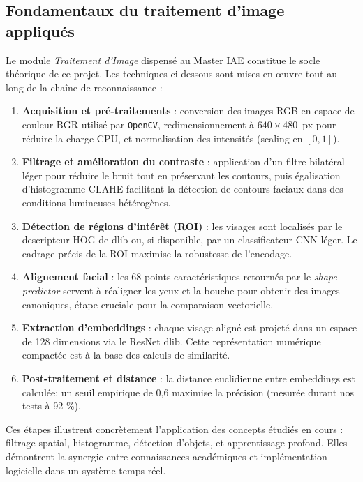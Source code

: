 \documentclass[12pt,a4paper]{article}
\begin{document}
\subsection{Fondamentaux du traitement d'image appliqués}
\label{sec:traitement-image}

Le module \textit{Traitement d'Image} dispensé au Master IAE constitue le socle théorique de ce projet. Les techniques ci-dessous sont mises en \oe{}uvre tout au long de la chaîne de reconnaissance :
\begin{enumerate}[label=\alph*)]
  \item \textbf{Acquisition et pré-traitements} : conversion des images RGB en espace de couleur BGR utilisé par \texttt{OpenCV}, redimensionnement à \(640\times480\)~px pour réduire la charge CPU, et normalisation des intensités (scaling en \([0,1]\)).
  \item \textbf{Filtrage et amélioration du contraste} : application d'un filtre bilatéral léger pour réduire le bruit tout en préservant les contours, puis égalisation d'histogramme CLAHE facilitant la détection de contours faciaux dans des conditions lumineuses hétérogènes.
  \item \textbf{Détection de régions d'intérêt (ROI)} : les visages sont localisés par le descripteur HOG de dlib ou, si disponible, par un classificateur CNN léger. Le cadrage précis de la ROI maximise la robustesse de l'encodage.
  \item \textbf{Alignement facial} : les 68 points caractéristiques retournés par le \textit{shape predictor} servent à réaligner les yeux et la bouche pour obtenir des images canoniques, étape cruciale pour la comparaison vectorielle.
  \item \textbf{Extraction d'embeddings} : chaque visage aligné est projeté dans un espace de 128 dimensions via le ResNet dlib. Cette représentation numérique compactée est à la base des calculs de similarité.
  \item \textbf{Post-traitement et distance} : la distance euclidienne entre embeddings est calculée; un seuil empirique de 0,6 maximise la précision (mesurée durant nos tests à 92 \%).
\end{enumerate}

Ces étapes illustrent concrètement l'application des concepts étudiés en cours : filtrage spatial, histogramme, détection d'objets, et apprentissage profond. Elles démontrent la synergie entre connaissances académiques et implémentation logicielle dans un système temps réel.
\end{document}
